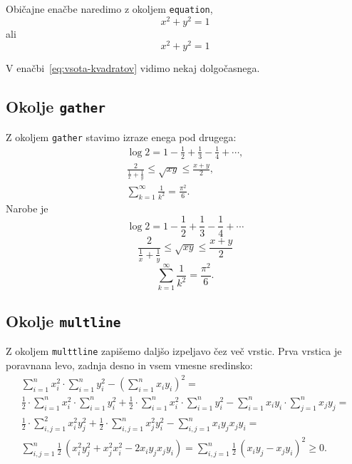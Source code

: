 \documentclass{amsart}
\begin{document}
Običajne enačbe naredimo z okoljem \texttt{equation},
%
\begin{equation*}
  x^2 + y^2 = 1
\end{equation*}
%
ali
%
\begin{equation}
  \label{eq:vsota-kvadratov}
  x^2 + y^2 = 1
\end{equation}

V enačbi~\eqref{eq:vsota-kvadratov} vidimo nekaj dolgočasnega.

\subsection{Okolje \texttt{gather}}

Z okoljem \texttt{gather} stavimo izraze enega pod drugega:
%
\begin{gather*}
  \log 2 = 1 - \frac{1}{2} + \frac{1}{3} - \frac{1}{4} + \cdots, \\
  \frac{2}{\frac{1}{x} + \frac{1}{y}} \leq \sqrt{x y} \leq \frac{x + y}{2}, \\
  \sum_{k = 1}^\infty \frac{1}{k^2} = \frac{\pi^2}{6}.
\end{gather*}
%
Narobe je
%
\[
  \log 2 = 1 - \frac{1}{2} + \frac{1}{3} - \frac{1}{4} + \cdots
\]
%
\[
  \frac{2}{\frac{1}{x} + \frac{1}{y}} \leq \sqrt{x y} \leq \frac{x + y}{2}
\]
%
\[
  \sum_{k = 1}^\infty \frac{1}{k^2} = \frac{\pi^2}{6}.
\]


\subsection{Okolje \texttt{multline}}

Z okoljem \texttt{multtline} zapišemo daljšo izpeljavo čez več vrstic. Prva vrstica je
poravnana levo, zadnja desno in vsem vmesne sredinsko:
%
\begin{multline*}
  \sum_{i=1}^n x_i^2 \cdot \sum_{i=1}^n y_i^2
  - \left( \sum_{i=1}^n x_i y_i \right)^2 = \\
  \frac{1}{2} \cdot \sum_{i=1}^n x_i^2 \cdot \sum_{i=1}^n y_i^2
  +
  \frac{1}{2} \cdot \sum_{i=1}^n x_i^2 \cdot \sum_{i=1}^n y_i^2
  -
  \sum_{i=1}^n x_i y_i \cdot \sum_{j=1}^n x_j y_j = \\
  \frac{1}{2} \cdot \sum_{i,j=1}^2 x_i^2 y_j^2
  +
  \frac{1}{2} \cdot \sum_{i,j=1}^n x_j^2 y_i^2
  -
  \sum_{i,j=1}^n x_i y_j x_j y_i = \\
  \sum_{i,j=1}^n \frac{1}{2}\,
  \left(
    x_i^2 y_j^2 + x_j^2 x_i^2 - 2 x_i y_j x_j y_i
  \right)
  =
  \sum_{i,j=1}^n \frac{1}{2}\,
  \left(
    x_i y_j - x_j y_i
  \right)^2
  \geq 0.
\end{multline*}
\end{document}
